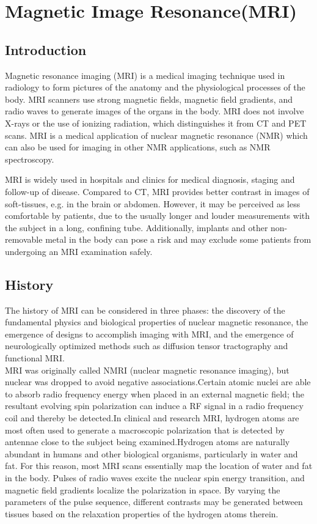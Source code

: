 \documentclass[12pt]{article}
\begin{document}
\section{Magnetic Image Resonance(MRI)}
\subsection{Introduction}
Magnetic resonance imaging (MRI) is a medical imaging technique used in radiology to form pictures of the anatomy and the physiological processes of the body. MRI scanners use strong magnetic fields, magnetic field gradients, and radio waves to generate images of the organs in the body. MRI does not involve X-rays or the use of ionizing radiation, which distinguishes it from CT and PET scans. MRI is a medical application of nuclear magnetic resonance (NMR) which can also be used for imaging in other NMR applications, such as NMR spectroscopy.

MRI is widely used in hospitals and clinics for medical diagnosis, staging and follow-up of disease. Compared to CT, MRI provides better contrast in images of soft-tissues, e.g. in the brain or abdomen. However, it may be perceived as less comfortable by patients, due to the usually longer and louder measurements with the subject in a long, confining tube. Additionally, implants and other non-removable metal in the body can pose a risk and may exclude some patients from undergoing an MRI examination safely.
\subsection{History}
The history of MRI can be considered in three phases: the discovery of the fundamental physics and biological properties of nuclear magnetic resonance, the emergence of designs to accomplish imaging with MRI, and the emergence of neurologically optimized methods such as diffusion tensor tractography and functional MRI.\\
MRI was originally called NMRI (nuclear magnetic resonance imaging), but nuclear was dropped to avoid negative associations.Certain atomic nuclei are able to absorb radio frequency energy when placed in an external magnetic field; the resultant evolving spin polarization can induce a RF signal in a radio frequency coil and thereby be detected.In clinical and research MRI, hydrogen atoms are most often used to generate a macroscopic polarization that is detected by antennae close to the subject being examined.Hydrogen atoms are naturally abundant in humans and other biological organisms, particularly in water and fat. For this reason, most MRI scans essentially map the location of water and fat in the body. Pulses of radio waves excite the nuclear spin energy transition, and magnetic field gradients localize the polarization in space. By varying the parameters of the pulse sequence, different contrasts may be generated between tissues based on the relaxation properties of the hydrogen atoms therein.
\end{document}
